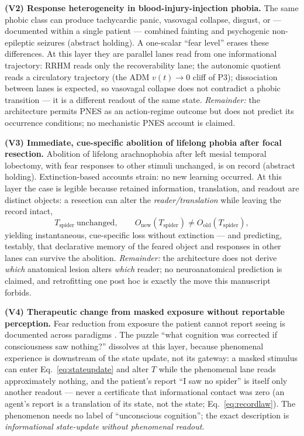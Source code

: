 \documentclass[9pt,twocolumn]{article}
\begin{document}
\textbf{(V2) Response heterogeneity in blood-injury-injection phobia.} The same phobic class can produce tachycardic panic, vasovagal collapse, disgust, or --- documented within a single patient --- combined fainting and psychogenic non-epileptic seizures \cite{vonmucke2022} (abstract holding). A one-scalar ``fear level'' erases these differences. At this layer they are parallel lanes read from one informational trajectory: RRHM reads only the recoverability lane; the autonomic quotient reads a circulatory trajectory (the ADM $v(t)\!\to\!0$ cliff of P3); dissociation between lanes is expected, so vasovagal collapse does not contradict a phobic transition --- it is a different readout of the same state. \emph{Remainder:} the architecture permits PNES as an action-regime outcome but does not predict its occurrence conditions; no mechanistic PNES account is claimed.

\textbf{(V3) Immediate, cue-specific abolition of lifelong phobia after focal resection.} Abolition of lifelong arachnophobia after left mesial temporal lobectomy, with fear responses to other stimuli unchanged, is on record \cite{binks2015} (abstract holding). Extinction-based accounts strain: no new learning occurred. At this layer the case is legible because retained information, translation, and readout are distinct objects: a resection can alter the \emph{reader/translation} while leaving the record intact,
\[
T_{\mathrm{spider}}\ \text{unchanged},\qquad O_{\mathrm{new}}(T_{\mathrm{spider}})\neq O_{\mathrm{old}}(T_{\mathrm{spider}}),
\]
yielding instantaneous, cue-specific loss without extinction --- and predicting, testably, that declarative memory of the feared object and responses in other lanes can survive the abolition. \emph{Remainder:} the architecture does not derive \emph{which} anatomical lesion alters \emph{which} reader; no neuroanatomical prediction is claimed, and retrofitting one post hoc is exactly the move this manuscript forbids.

\textbf{(V4) Therapeutic change from masked exposure without reportable perception.} Fear reduction from exposure the patient cannot report seeing is documented across paradigms \cite{siegel2025}. The puzzle ``what cognition was corrected if consciousness saw nothing?'' dissolves at this layer, because phenomenal experience is downstream of the state update, not its gateway: a masked stimulus can enter Eq.~\ref{eq:stateupdate} and alter $T$ while the phenomenal lane reads approximately nothing, and the patient's report ``I saw no spider'' is itself only another readout --- never a certificate that informational contact was zero (an agent's report is a translation of its state, not the state; Eq.~\ref{eq:recordlaw}). The phenomenon needs no label of ``unconscious cognition''; the exact description is \emph{informational state-update without phenomenal readout}.
\end{document}
